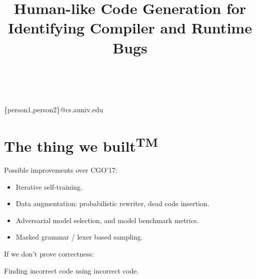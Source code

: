 


        
\title{Human-like Code Generation for Identifying Compiler and Runtime Bugs}

%
%
{ \\
          \\
        }
{\{person1,person2\}@cs.auniv.edu}

\maketitle






\section{The thing we built\textsuperscript{TM}}

Possible improvements over CGO'17:

\begin{itemize}
        \item Iterative self-training.
        \item Data augmentation: probabilistic rewriter, dead code insertion.
        \item Adversarial model selection, and model benchmark metrics.
        \item Masked grammar / lexer based sampling.
\end{itemize}

\noindent If we don't prove correctness:

Finding incorrect code using incorrect code.

